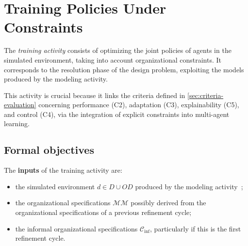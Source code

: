 \clearpage
\thispagestyle{empty}
\null
\newpage

\chapter{Training Policies Under Constraints}
\label{chap:training}

The \textit{training activity} consists of optimizing the joint policies of agents in the simulated environment, taking into account organizational constraints.
It corresponds to the resolution phase of the design problem, exploiting the models produced by the modeling activity.

This activity is crucial because it links the criteria defined in \autoref{sec:criteria-evaluation} concerning performance (C2), adaptation (C3), explainability (C5), and control (C4), via the integration of explicit constraints into multi-agent learning.

\section*{Formal objectives}

The \textbf{inputs} of the training activity are:
\begin{itemize}
  \item the simulated environment $d \in D \cup OD$ produced by the modeling activity~;
  \item the organizational specifications $\mathcal{MM}$ possibly derived from the organizational specifications of a previous refinement cycle;
  \item the informal organizational specifications $\mathcal{C}_{\text{inf}}$, particularly if this is the first refinement cycle.
\end{itemize}

